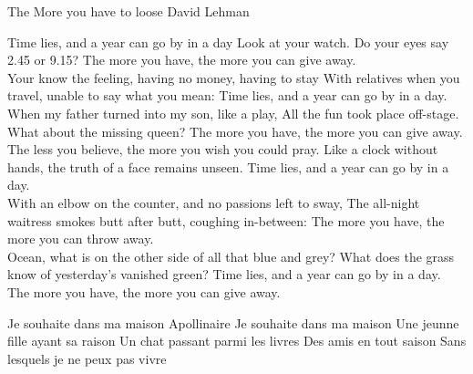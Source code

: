 \begin{poem}
{The More you have to loose}
{David Lehman}

Time lies, and a year can go by in a day
Look at your watch. Do your eyes say 2.45 or 9.15?
The more you have, the more you can give away.\\

Your know the feeling, having no money, having to stay
With relatives when you travel, unable to say what you mean:
Time lies, and a year can go by in a day.\\

When my father turned into my son, like a play,
All the fun took place off-stage. What about the missing queen?
The more you have, the more you can give away.\\

The less you believe, the more you wish you could pray.
Like a clock without hands, the truth of a face remains unseen.
Time lies, and a year can go by in a day.\\

With an elbow on the counter, and no passions left to sway,
The all-night waitress smokes butt after butt, coughing in-between: 
The more you have, the more you can throw away.\\

Ocean, what is on the other side of all that blue and grey?
What does the grass know of yesterday's vanished green?
Time lies, and a year can go by in a day.
The more you have, the more you can give away.
\end{poem}


\begin{poem}
{Je souhaite dans ma maison}
{Apollinaire}
Je souhaite dans ma maison
Une jeunne fille ayant sa raison
Un chat passant parmi les livres
Des amis en tout saison
Sans lesquels je ne peux pas vivre
\end{poem}

